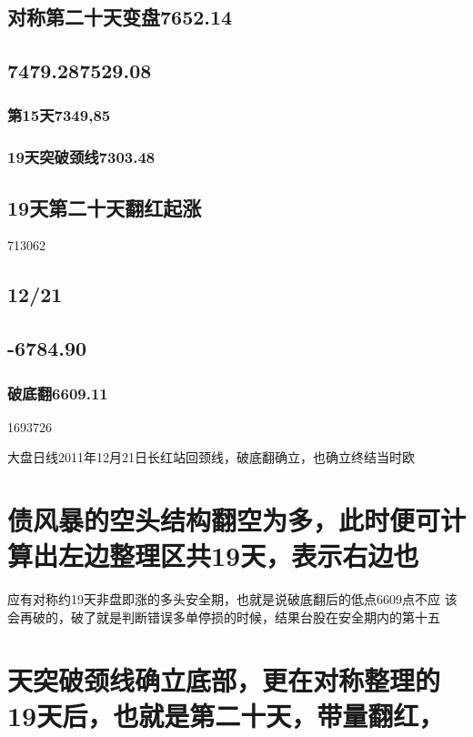\documentclass{article}
\begin{document}
\subsection{对称第二十天变盘7652.14}

\subsection{7479.287529.08}

\subsubsection{第15天7349,85}

\subsubsection{19天突破颈线7303.48}

\subsection{19天第二十天翻红起涨}

713062

\subsection{12/21}

\subsection{-6784.90}

\subsubsection{破底翻6609.11}

1693726

大盘日线2011年12月21日长红站回颈线，破底翻确立，也确立终结当时欧

\section{债风暴的空头结构翻空为多，此时便可计算出左边整理区共19天，表示右边也}

应有对称约19天非盘即涨的多头安全期，也就是说破底翻后的低点6609点不应 该会再破的，破了就是判断错误多单停损的时候，结果台股在安全期内的第十五

\section{天突破颈线确立底部，更在对称整理的19天后，也就是第二十天，带量翻红，}
\end{document}
